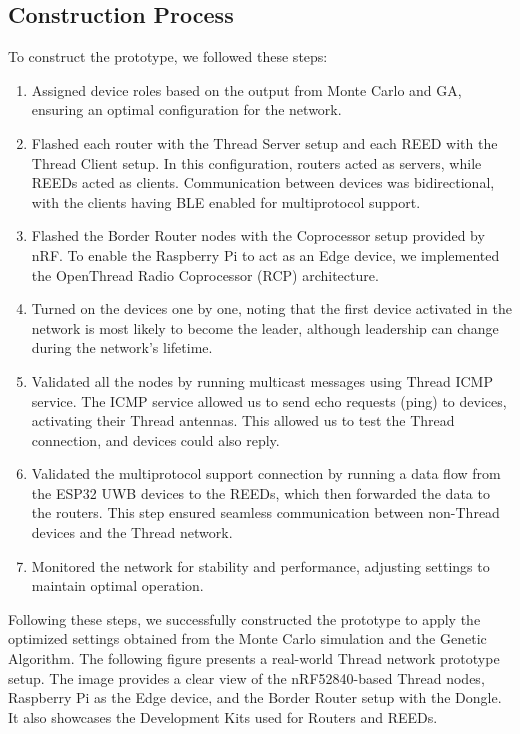 \subsection{Construction Process}\label{sec:construction_process}
To construct the prototype, we followed these steps:

\vspace{2mm}
\begin{enumerate}
    \item Assigned device roles based on the output from Monte Carlo and GA, ensuring an optimal configuration for the network.
    \item Flashed each router with the Thread Server setup and each REED with the Thread Client setup. In this configuration, routers acted as servers, while REEDs acted as clients. Communication between devices was bidirectional, with the clients having BLE enabled for multiprotocol support.
    \item Flashed the Border Router nodes with the Coprocessor setup provided by nRF. To enable the Raspberry Pi to act as an Edge device, we implemented the OpenThread Radio Coprocessor (RCP) architecture.
    \item Turned on the devices one by one, noting that the first device activated in the network is most likely to become the leader, although leadership can change during the network's lifetime.
    \item Validated all the nodes by running multicast messages using Thread ICMP service. The ICMP service allowed us to send echo requests (ping) to devices, activating their Thread antennas. This allowed us to test the Thread connection, and devices could also reply.
    \item Validated the multiprotocol support connection by running a data flow from the ESP32 UWB devices to the REEDs, which then forwarded the data to the routers. This step ensured seamless communication between non-Thread devices and the Thread network.
    \item Monitored the network for stability and performance, adjusting settings to maintain optimal operation.
\end{enumerate}
\vspace{3mm}

Following these steps, we successfully constructed the prototype to apply the optimized settings obtained from the Monte Carlo simulation and the Genetic Algorithm. The following figure presents a real-world Thread network prototype setup. The image provides a clear view of the nRF52840-based Thread nodes, Raspberry Pi as the Edge device, and the Border Router setup with the Dongle. It also showcases the Development Kits used for Routers and REEDs.

